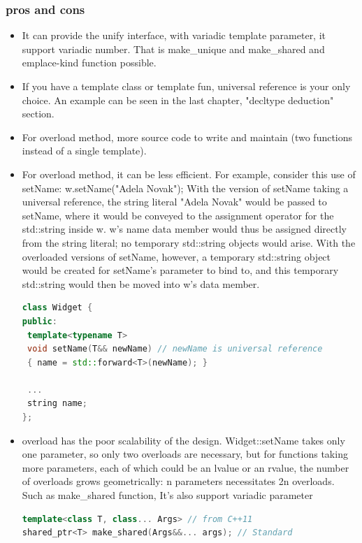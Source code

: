 \documentclass[a4paper,12pt,twoside]{book}
\begin{document}
\subsubsection{pros and cons}
\begin{itemize}
\item It can provide the unify interface, with variadic template parameter, it support variadic number. That is make\_unique and make\_shared and emplace-kind function possible.

\item If you have a template class or template fun, universal reference is your only choice. An example can be seen in the last chapter, "decltype deduction" section.

\item For overload method, more source code to write and maintain (two functions instead of a single template). 

\item For overload method, it can be less efficient. For example, consider this use of setName: w.setName("Adela Novak"); With the version of setName taking a universal reference, the string literal "Adela Novak" would be passed to setName, where it would be conveyed to the assignment operator for the std::string inside w. w's name data member would thus be assigned directly from the string literal; no temporary std::string objects would arise. With the overloaded versions of setName, however, a temporary std::string object
would be created for setName's parameter to bind to, and this temporary std::string would then be moved into w's data member.

\begin{lstlisting}[frame=single, language=c++]
class Widget {
public:
 template<typename T>
 void setName(T&& newName) // newName is universal reference
 { name = std::forward<T>(newName); }
 
 ... 
 string name;    
};

\end{lstlisting}


\item overload has the poor scalability of the design. Widget::setName takes only one parameter, so only two overloads are necessary, but for functions taking more parameters, each of which could be an lvalue or an rvalue, the number of overloads grows geometrically: n parameters necessitates 2n overloads. Such as make\_shared function, It's also support variadic parameter

\begin{lstlisting}[frame=single, language=c++]
template<class T, class... Args> // from C++11
shared_ptr<T> make_shared(Args&&... args); // Standard


\end{lstlisting}
\end{itemize}
\end{document}
